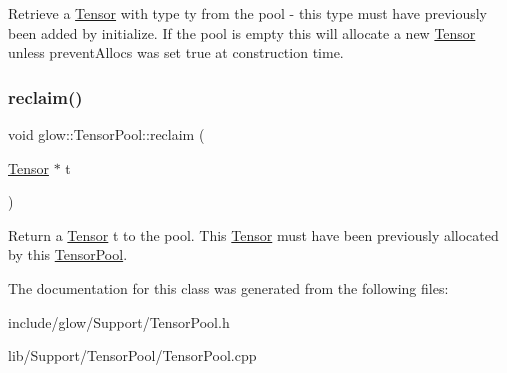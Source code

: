 Retrieve a \hyperlink{classglow_1_1_tensor}{Tensor} with type {\ttfamily ty} from the pool -\/ this type must have previously been added by initialize. If the pool is empty this will allocate a new \hyperlink{classglow_1_1_tensor}{Tensor} unless prevent\+Allocs was set true at construction time. \mbox{\label{classglow_1_1_tensor_pool_aca0c52c7f6857d238dbe7873766f5350}} 
\subsubsection{\texorpdfstring{reclaim()}{reclaim()}}
{\footnotesize\ttfamily void glow\+::\+Tensor\+Pool\+::reclaim (\begin{DoxyParamCaption}\item[{\hyperlink{classglow_1_1_tensor}{Tensor} $\ast$}]{t }\end{DoxyParamCaption})}

Return a \hyperlink{classglow_1_1_tensor}{Tensor} {\ttfamily t} to the pool. This \hyperlink{classglow_1_1_tensor}{Tensor} must have been previously allocated by this \hyperlink{classglow_1_1_tensor_pool}{Tensor\+Pool}. 

The documentation for this class was generated from the following files\+:\begin{DoxyCompactItemize}
\item 
include/glow/\+Support/Tensor\+Pool.\+h\item 
lib/\+Support/\+Tensor\+Pool/Tensor\+Pool.\+cpp\end{DoxyCompactItemize}
